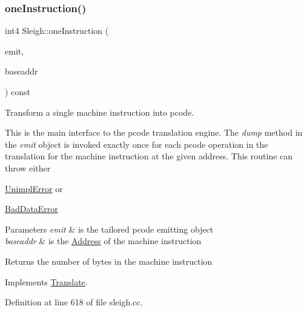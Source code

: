\subsubsection{\texorpdfstring{oneInstruction()}{oneInstruction()}}
{\footnotesize\ttfamily int4 Sleigh\+::one\+Instruction (\begin{DoxyParamCaption}\item[{\mbox{\hyperlink{class_pcode_emit}{Pcode\+Emit}} \&}]{emit,  }\item[{const \mbox{\hyperlink{class_address}{Address}} \&}]{baseaddr }\end{DoxyParamCaption}) const\hspace{0.3cm}{\ttfamily [virtual]}}



Transform a single machine instruction into pcode. 

This is the main interface to the pcode translation engine. The {\itshape dump} method in the {\itshape emit} object is invoked exactly once for each pcode operation in the translation for the machine instruction at the given address. This routine can throw either
\begin{DoxyItemize}
\item \mbox{\hyperlink{struct_unimpl_error}{Unimpl\+Error}} or
\item \mbox{\hyperlink{struct_bad_data_error}{Bad\+Data\+Error}}
\end{DoxyItemize}


\begin{DoxyParams}{Parameters}
{\em emit} & is the tailored pcode emitting object \\
\hline
{\em baseaddr} & is the \mbox{\hyperlink{class_address}{Address}} of the machine instruction \\
\hline
\end{DoxyParams}
\begin{DoxyReturn}{Returns}
the number of bytes in the machine instruction 
\end{DoxyReturn}


Implements \mbox{\hyperlink{class_translate_a1737782c38ee43de62ae2e7572321fc9}{Translate}}.



Definition at line 618 of file sleigh.\+cc.

